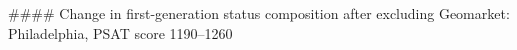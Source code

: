 #### Change in first-generation status composition after excluding Geomarket: Philadelphia, PSAT score 1190–1260
